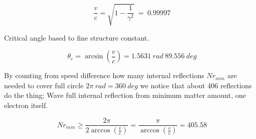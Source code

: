 


\begin{equation} \label{eq:speed}
	\frac{v}{c}=\sqrt{1-\frac{1}{\gamma^2}} ~=~ 0.99997
\end{equation}




Critical angle based to fine structure constant.

\begin{equation} \label{eq:critical_angle}
	\theta_c= \arcsin(\frac{v}{c}) = 1.5631~rad~89.556~deg
\end{equation}


By counting from speed difference how many internal reflections $Nr_{min}$
are needed to cover full circle $2\pi~rad = 360~deg$ we notice that about
406 reflections do the thing; Wave full internal reflection from minimum
matter amount, one electron itself.

\begin{equation} \label{eq:minimum_number_of_reflections}
	Nr_{min}\geq
	\frac {2\pi}{2\arccos(\frac{v}{c})}
	=\frac {\pi}{\arccos(\frac{v}{c})}
	= 405.58
\end{equation}

